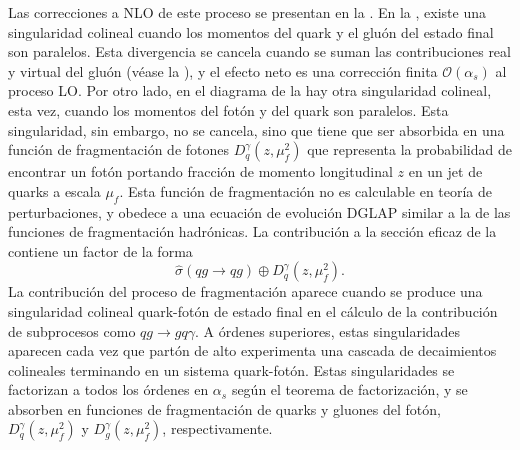 Las correcciones a \ac{NLO} de este proceso se presentan en la \Fig{\ref{fig:theory:sm:prompt_photon:feynman_nlo_direct}}. En la \Fig{\ref{fig:theory:sm:prompt_photon:feynman_nlo_direct:gluon}}, existe una singularidad colineal cuando los momentos del quark y el gluón del estado final son paralelos. Esta divergencia se cancela cuando se suman las contribuciones real y virtual del gluón (véase la \Fig{\ref{fig:theory:sm:prompt_photon:feynman_nlo_direct:gluon_virtual}}), y el efecto neto es una corrección finita \(\mathcal{O}(\alpha_s)\) al proceso \ac{LO}. Por otro lado, en el diagrama de la \Fig{\ref{fig:theory:sm:prompt_photon:feynman_nlo_direct:photon}} hay otra singularidad colineal, esta vez, cuando los momentos del fotón y del quark son paralelos. Esta singularidad, sin embargo, no se cancela, sino que tiene que ser absorbida en una función de fragmentación de fotones \(D_q^{\gamma} (z, \mu^2_f )\) que representa la probabilidad de encontrar un fotón portando fracción de momento longitudinal \(z\) en un jet de quarks a escala \(\mu_f\). Esta función de fragmentación no es calculable en teoría de perturbaciones, y obedece a una ecuación de evolución DGLAP similar a la de las funciones de fragmentación hadrónicas. La contribución a la sección eficaz de la \Fig{\ref{fig:theory:sm:prompt_photon:feynman_nlo_direct:photon}} contiene un factor de la forma
\begin{equation}
    \label{eq:theory:sm:prompt_photon:fragmentation_contribution}
    \hat{\sigma}(qg \to qg) \oplus D_q^{\gamma} \left(z, \mu_f^2\right).
\end{equation}
La contribución del proceso de fragmentación aparece cuando se produce una singularidad colineal quark-fotón de estado final en el cálculo de la contribución de subprocesos como \(qg \to gq\gamma\).
A órdenes superiores, estas singularidades aparecen cada vez que part\'on de alto \pt experimenta una cascada de decaimientos colineales terminando en un sistema quark-fot\'on. Estas singularidades se factorizan a todos los órdenes en \(\alpha_s\) según el teorema de factorización, y se absorben en funciones de fragmentación de quarks y gluones del fotón, \(D_q^{\gamma} \left(z, \mu_f^2\right)\) y \(D_g^{\gamma} \left(z, \mu_f^2\right)\), respectivamente.

